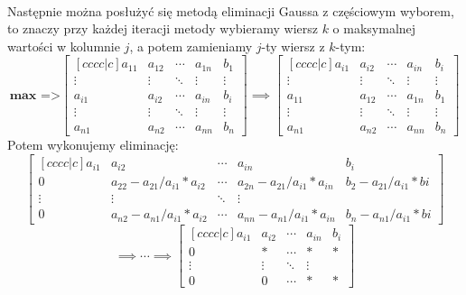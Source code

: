 \documentclass[12pt, flegn, leqno]{article}
\begin{document}
        \paragraph{}
        Następnie można posłużyć się metodą eliminacji Gaussa z częściowym wyborem,
        to znaczy przy każdej iteracji metody wybieramy wiersz $k$ o maksymalnej wartości
        w kolumnie $j$, a potem zamieniamy $j$-ty wiersz z $k$-tym:
        \[
            \textbf{max =>}
            \begin{bmatrix}[cccc|c]
                a_{11} & a_{12} & \cdots & a_{1n} & b_{1}\\
                \vdots & \vdots & \ddots & \vdots & \vdots\\
                a_{i1} & a_{i2} & \cdots & a_{in} & b_{i}\\
                \vdots & \vdots & \ddots & \vdots & \vdots\\
                a_{n1} & a_{n2} & \cdots & a_{nn} & b_{n}
            \end{bmatrix}
            \implies
            \begin{bmatrix}[cccc|c]
                a_{i1} & a_{i2} & \cdots & a_{in} & b_{i}\\
                \vdots & \vdots & \ddots & \vdots & \vdots\\
                a_{11} & a_{12} & \cdots & a_{1n} & b_{1}\\
                \vdots & \vdots & \ddots & \vdots & \vdots\\
                a_{n1} & a_{n2} & \cdots & a_{nn} & b_{n}
            \end{bmatrix}
        \]
        Potem wykonujemy eliminację:
        \[
            \begin{bmatrix}[cccc|c]
                a_{i1} & a_{i2}& \cdots & a_{in} & b_{i}\\
                0 & a_{22} - a_{21}/a_{i1} * a_{i2} & \cdots & a_{2n} - a_{21}/a_{i1} * a_{in} & b_{2} - a_{21}/a_{i1} * b{i}\\
                \vdots & \vdots & \ddots & \vdots\\
                0 & a_{n2} - a_{n1}/a_{i1} * a_{i2} & \cdots & a_{nn} - a_{n1}/a_{i1} * a_{in} & b_{n} - a_{n1}/a_{i1} * b{i}
            \end{bmatrix}
        \]
        \[
            \implies \cdots \implies
            \begin{bmatrix}[cccc|c]
                a_{i1} & a_{i2}& \cdots & a_{in} & b_{i}\\
                0 & * & \cdots & * & *\\
                \vdots & \vdots & \ddots & \vdots\\
                0 & 0 & \cdots & * & *
            \end{bmatrix}
        \] 
    
\end{document}
